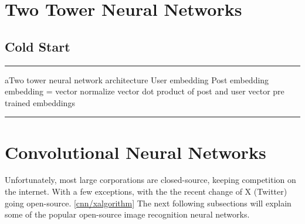 \section{Two Tower Neural Networks} \label{nn}

\subsection{Cold Start}\label{cold-start}

\noindent\rule{2cm}{0.4pt}

aTwo tower neural network architecture 
User embedding
Post embedding
embedding = vector
normalize vector
dot product of post and user vector
pre trained embeddings

\noindent\rule{2cm}{0.4pt}

\section{Convolutional Neural Networks}

Unfortunately, most large corporations are closed-source, keeping competition on the internet. With a few exceptions, with the the recent change of X (Twitter) going open-source. \ref{cnn/xalgorithm} The next following subsections will explain some of the popular open-source image recognition neural networks.







